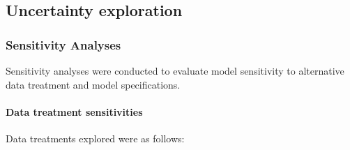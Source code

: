 \documentclass[11pt,
  english,
  a4paper,
]{article}
\begin{document}

\hypertarget{uncertainty-exploration}{%
\subsection{Uncertainty exploration}\label{uncertainty-exploration}}

\leavevmode\tagmcend\tagstructend


\hypertarget{sensitivity-analyses}{%
\subsubsection{Sensitivity Analyses}\label{sensitivity-analyses}}

\leavevmode\tagmcend\tagstructend


Sensitivity analyses were conducted to evaluate model sensitivity to alternative data treatment and model specifications.

\leavevmode\tagmcend\tagstructend\par


\hypertarget{data-treatment-sensitivities}{%
\paragraph{Data treatment sensitivities}\label{data-treatment-sensitivities}}

\leavevmode\tagmcend\tagstructend


Data treatments explored were as follows:

\leavevmode\tagmcend\tagstructend\par

\end{document}
